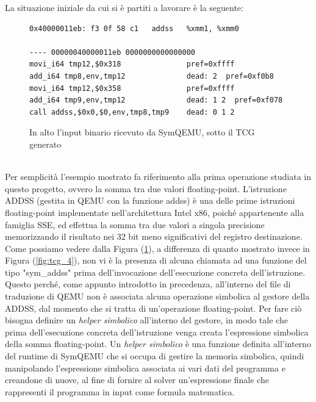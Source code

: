 \documentclass[Lau, oneside]{sapthesis}%
\begin{document}
\newpage
La situazione iniziale da cui si è partiti a lavorare è la seguente:
\begin{figure}[h]
\begin{lstlisting}[xleftmargin=0\textwidth, language=SymQEMU]
0x40000011eb: f3 0f 58 c1   addss   %xmm1, %xmm0

---- 00000040000011eb 0000000000000000
movi_i64 tmp12,$0x318               pref=0xffff
add_i64 tmp8,env,tmp12              dead: 2  pref=0xf0b8
movi_i64 tmp12,$0x358               pref=0xffff
add_i64 tmp9,env,tmp12              dead: 1 2  pref=0xf078
call addss,$0x0,$0,env,tmp8,tmp9    dead: 0 1 2
\end{lstlisting}
    \caption{In alto l'input binario ricevuto da SymQEMU, sotto il TCG generato}
    \label{fig:addss_prima}
\end{figure}
\ \\
Per semplicità l'esempio mostrato fa riferimento alla prima operazione studiata in questo progetto, ovvero la somma tra due valori floating-point.
\newline
L'istruzione ADDSS (gestita in QEMU con la funzione addss) è una delle prime istruzioni floating-point implementate nell'architettura Intel x86, poiché appartenente alla famiglia SSE, ed effettua la somma tra due valori a singola precisione memorizzando il risultato nei 32 bit meno significativi del registro destinazione.
\newline \newline
Come possiamo vedere dalla Figura (\ref{fig:addss_prima}), a differenza di quanto mostrato invece in Figura (\ref{fig:tcg_4}), non vi è la presenza di alcuna chiamata ad una funzione del tipo "sym\_addss" prima dell'invocazione dell'esecuzione concreta dell'istruzione.
\newline
Questo perché, come appunto introdotto in precedenza, all'interno del file di traduzione di QEMU non è associata alcuna operazione simbolica al gestore della ADDSS, dal momento che si tratta di un'operazione floating-point.
\newline \newline
Per fare ciò bisogna definire un \textit{helper simbolico} all'interno del gestore, in modo tale che prima dell'esecuzione concreta dell'istruzione venga creata l'espressione simbolica della somma floating-point.
\newline
Un \textit{helper simbolico} è una funzione definita all'interno del runtime di SymQEMU che si occupa di gestire la memoria simbolica, quindi manipolando l'espressione simbolica associata ai vari dati del programma e creandone di nuove, al fine di fornire al solver un'espressione finale che rappresenti il programma in input come formula matematica.
\end{document}
